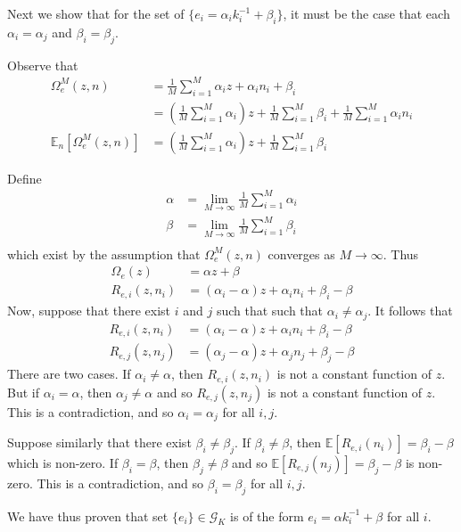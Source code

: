 Next we show that for the set of $\{{e}_i = {\alpha}_i {k}_i^{-1} + {\beta}_i\}$, it must be the case that each ${\alpha}_i = {\alpha}_j$ and ${\beta}_i = {\beta}_j$.

Observe that
\begin{align*}
\Omega_{{e}}^M({z}, {n}) &= \frac{1}{M} \sum_{i=1}^M {\alpha}_i {z} + {\alpha}_i {n}_i + {\beta}_i \\
&= \left( \frac{1}{M} \sum_{i=1}^M {\alpha}_i \right){z} + \frac{1}{M} \sum_{i=1}^M {\beta}_i  + \frac{1}{M} \sum_{i=1}^M {\alpha}_i {{n}}_i \\
\mathbb{E}_{{n}}[\Omega_{{e}}^M({z}, {n})] &= \left( \frac{1}{M} \sum_{i=1}^M {\alpha}_i \right){z} +  \frac{1}{M} \sum_{i=1}^M {\beta}_i
\end{align*}

Define
\begin{align*}
{\alpha} &= \lim_{M\to\infty}\frac{1}{M}\sum_{i=1}^M {\alpha}_i \\
{\beta} &= \lim_{M\to\infty}\frac{1}{M}\sum_{i=1}^M {\beta}_i \\
\end{align*}
which exist by the assumption that $\Omega_{{e}}^M({z}, {n})$ converges as $M\to\infty$.
Thus
\begin{align*}
\Omega_{{e}}({z}) &= {\alpha} {z} + {\beta} \\
R_{{e}, i}({z}, {n}_i) &= ({\alpha}_i - {\alpha}){z} + {\alpha}_i{n}_i + {\beta}_i - {\beta}
\end{align*}
Now, suppose that there exist $i$ and $j$ such that such that ${\alpha}_i \not= {\alpha}_j$.
It follows that
\begin{align*}
R_{{e}, i}({z}, {n}_i) &= ({\alpha}_i - {\alpha}){z} + {\alpha}_i{n}_i + {\beta}_i - {\beta} \\
R_{{e}, j}({z}, {n}_j) &= ({\alpha}_j - {\alpha}){z} + {\alpha}_j{n}_j + {\beta}_j - {\beta}
\end{align*}
There are two cases.
If ${\alpha}_i \not={\alpha}$, then $R_{{e}, i}({z}, {n}_i)$ is not a constant function of ${z}$.
But if ${\alpha}_i ={\alpha}$, then ${\alpha}_j \not={\alpha}$ and so $R_{{e}, j}({z}, {n}_j)$ is not a constant function of ${z}$.
This is a contradiction, and so ${\alpha}_i = {\alpha}_j$ for all $i,j$.

Suppose similarly that there exist ${\beta}_i \not={\beta}_j$.
If ${\beta}_i \not={\beta}$, then $\mathbb{E}[R_{{e}, i}({n}_i)] = {\beta}_i - {\beta}$ which is non-zero.
If ${\beta}_i ={\beta}$, then ${\beta}_j \not={\beta}$ and so $\mathbb{E}[R_{{e}, j}({n}_j)] = {\beta}_j - {\beta}$ is non-zero.
This is a contradiction, and so ${\beta}_i = {\beta}_j$ for all $i,j$.

We have thus proven that set $\{ {e}_i \} \in \mathcal{G}_K$ is of the form ${e}_i = {\alpha} {k}_i^{-1} + {\beta}$ for all $i$.